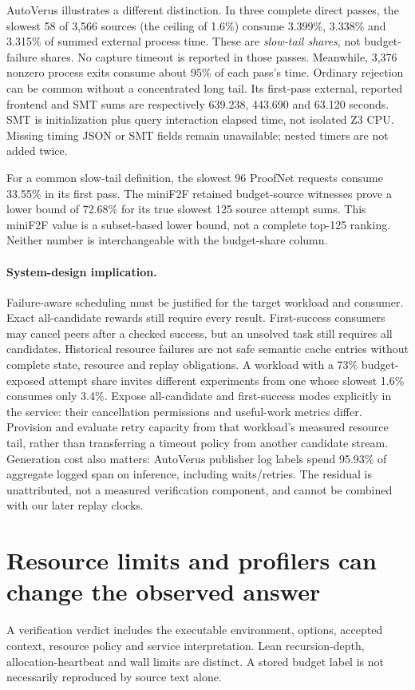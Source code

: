 \documentclass[10pt,twocolumn]{article}
\begin{document}
AutoVerus illustrates a different distinction. In three complete direct
passes, the slowest 58 of 3,566 sources (the ceiling of 1.6\%) consume
3.399\%, 3.338\% and 3.315\% of summed external process time.
These are \emph{slow-tail shares}, not budget-failure shares.
No capture timeout is reported in those passes.
Meanwhile, 3,376 nonzero process exits consume about 95\% of each pass's
time. Ordinary rejection can be common without a concentrated long tail.
Its first-pass external, reported frontend and SMT sums are respectively
639.238, 443.690 and 63.120 seconds. SMT is initialization plus query
interaction elapsed time, not isolated Z3 CPU. Missing timing JSON or SMT
fields remain unavailable; nested timers are not added twice.

For a common slow-tail definition, the slowest 96 ProofNet requests consume
33.55\% in its first pass. The miniF2F retained budget-source witnesses prove
a lower bound of 72.68\% for its true slowest 125 source attempt sums.
This miniF2F value is a subset-based lower bound, not a complete top-125
ranking. Neither number is interchangeable with the budget-share column.

\paragraph{System-design implication.}
Failure-aware scheduling must be justified for the target workload and
consumer. Exact all-candidate rewards still require every result.
First-success consumers may cancel peers after a checked success, but an
unsolved task still requires all candidates. Historical resource failures
are not safe semantic cache entries without complete state, resource and
replay obligations.
A workload with a 73\% budget-exposed attempt share invites different
experiments from one whose slowest 1.6\% consumes only 3.4\%.
Expose all-candidate and first-success modes explicitly in the service:
their cancellation permissions and useful-work metrics differ. Provision
and evaluate retry capacity from that workload's measured resource tail,
rather than transferring a timeout policy from another candidate stream.
Generation cost also matters: AutoVerus publisher log labels spend
95.93\% of aggregate logged span on inference, including waits/retries.
The residual is unattributed, not a measured verification component, and
cannot be combined with our later replay clocks.

\section{Resource limits and profilers can change the observed answer}
\label{sec:reproducibility}
A verification verdict includes the executable environment, options,
accepted context, resource policy and service interpretation.
Lean recursion-depth, allocation-heartbeat and wall limits are distinct.
A stored budget label is not necessarily reproduced by source text alone.
\end{document}
